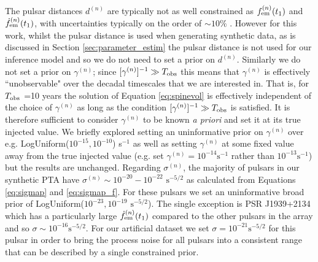 \documentclass[fleqn,usenatbib,useAMS]{mnras}
\providecommand{\DIFadd}[1]{{\protect\color{blue}\uwave{#1}}} %
\providecommand{\DIFdel}[1]{{\protect\color{red}\sout{#1}}}                      %
\providecommand{\DIFaddbegin}{} %
\providecommand{\DIFaddend}{} %
\providecommand{\DIFdelbegin}{} %
\providecommand{\DIFdelend}{} %
\newcommand{\DIFscaledelfig}{0.5}
\newlength{\DIFdelgraphicswidth} %
\newlength{\DIFdelgraphicsheight} %
\newcommand{\DIFaddincludegraphics}[2][]{{\color{blue}\fbox{\DIFOincludegraphics[#1]{#2}}}} %
\newcommand{\DIFdelincludegraphics}[2][]{%
\sbox{\DIFdelgraphicsbox}{\DIFOincludegraphics[#1]{#2}}%
\settoboxwidth{\DIFdelgraphicswidth}{\DIFdelgraphicsbox} %
\settoboxtotalheight{\DIFdelgraphicsheight}{\DIFdelgraphicsbox} %
\scalebox{\DIFscaledelfig}{%
\parbox[b]{\DIFdelgraphicswidth}{\usebox{\DIFdelgraphicsbox}\\[-\baselineskip] \rule{\DIFdelgraphicswidth}{0em}}\llap{\resizebox{\DIFdelgraphicswidth}{\DIFdelgraphicsheight}{%
\setlength{\unitlength}{\DIFdelgraphicswidth}%
\begin{picture}(1,1)%
\thicklines\linethickness{2pt} %
{\color[rgb]{1,0,0}\put(0,0){\framebox(1,1){}}}%
{\color[rgb]{1,0,0}\put(0,0){\line( 1,1){1}}}%
{\color[rgb]{1,0,0}\put(0,1){\line(1,-1){1}}}%
\end{picture}%
}\hspace*{3pt}}} %
} %
\DeclareRobustCommand{\DIFaddbegin}{\DIFOaddbegin \let\includegraphics\DIFaddincludegraphics} %
\DeclareRobustCommand{\DIFaddend}{\DIFOaddend \let\includegraphics\DIFOincludegraphics} %
\DeclareRobustCommand{\DIFdelbegin}{\DIFOdelbegin \let\includegraphics\DIFdelincludegraphics} %
\DeclareRobustCommand{\DIFdelend}{\DIFOaddend \let\includegraphics\DIFOincludegraphics} %
\begin{document}
The pulsar distances $d^{(n)}$ are typically not as well constrained as $f_{\rm em}^{(n)} (t_1)$ and $\dot{f}_{\rm em}^{(n)} (t_1)$, with uncertainties typically on the order of $\sim 10 \%$ \citep{Arzoumanian2018ApJS..235...37A,Yao2017}. However for this work, whilst the pulsar distance is used when generating synthetic data, as is discussed in Section \ref{sec:parameter_estim} the pulsar distance is not used for our inference model and so we do not need to set a prior on $d^{(n)}$. Similarly we do not set a prior on $\gamma^{(n)}$; since $[\gamma^{(n)}]^{-1} \gg T_{\rm obs}$ this means that $\gamma^{(n)}$ is effectively ``unobservable" over the decadal timescales that we are interested in. That is, for $T_{\rm obs}$ =10 years the solution of Equation \eqref{eq:spinevol} is effectively independent of the choice of $\gamma^{(n)}$ as long as the condition $[\gamma^{(n)}]^{-1} \gg T_{\rm obs}$ is satisfied. It is therefore sufficient to consider $\gamma^{(n)}$ to be known \textit{a priori} and set it at its true injected value. We briefly explored setting an uninformative prior on $\gamma^{(n)}$ over e.g. LogUniform($10^{-15}, 10^{-10}$) s$^{-1}$ as well as setting $\gamma^{(n)}$ at some fixed value away from the true injected value (e.g. set $\gamma^{(n)} = 10^{-14} \text{s}^{-1}$ rather than $10^{-13} \text{s}^{-1}$) but the results are unchanged. Regarding $\sigma^{(n)}$, the majority of pulsars in our synthetic PTA have \DIFdelbegin \DIFdel{$\sigma^{(n)} \sim 10^{-20} - 10^{-22} \text{ s}^{-5/2}$ }\DIFdelend \DIFaddbegin \DIFadd{$\sigma^{(n)} \sim 10^{-20} - 10^{-22} \text{ s}^{-3/2}$ }\DIFaddend as calculated from Equations \eqref{eq:sigmap} and \eqref{eq:sigmap_f}. For these pulsars we set an uninformative broad prior of LogUniform($10^{-23}, 10^{-19}$ \DIFdelbegin \DIFdel{$\text{s}^{-5/2}$}\DIFdelend \DIFaddbegin \DIFadd{$\text{s}^{-3/2}$}\DIFaddend ). The single exception is PSR J1939+2134 which has a particularly large $\dot{f}_{\rm em}^{(n)} (t_1)$ compared to the other pulsars in the array and so \DIFdelbegin \DIFdel{$\sigma \sim 10^{-16} \text{s}^{-5/2}$}\DIFdelend \DIFaddbegin \DIFadd{$\sigma \sim 10^{-16} \text{s}^{-3/2}$}\DIFaddend . For our artificial dataset we set \DIFdelbegin \DIFdel{$\sigma = 10^{-21} \text{s}^{-5/2}$ }\DIFdelend \DIFaddbegin \DIFadd{$\sigma = 10^{-21} \text{s}^{-3/2}$ }\DIFaddend for this pulsar in order to bring the process noise for all pulsars into a consistent range that can be described by a single constrained prior. \newline 
\end{document}
